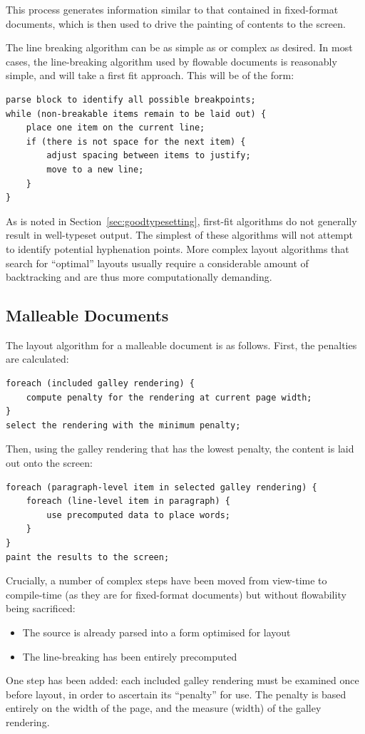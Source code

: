 This process generates information similar to that contained in fixed-format documents, which is then used to drive the painting of contents to the screen.

The line breaking algorithm can be as simple as or complex as desired. In most cases, the line-breaking algorithm used by flowable documents is reasonably simple, and will take a first fit approach. This will be of the form:

{\singlespacing
\begin{lstlisting}
parse block to identify all possible breakpoints;
while (non-breakable items remain to be laid out) {
    place one item on the current line;
    if (there is not space for the next item) {
        adjust spacing between items to justify;
        move to a new line;
    }
}
\end{lstlisting}
}

As is noted in Section~\ref{sec:goodtypesetting}, first-fit algorithms do not generally result in well-typeset output. The simplest of these algorithms will not attempt to identify potential hyphenation points. More complex layout algorithms that search for ``optimal'' layouts usually require a considerable amount of backtracking and are thus more computationally demanding.

\subsection{Malleable Documents}

The layout algorithm for a malleable document is as follows. First, the penalties are calculated:

{\singlespacing
\begin{lstlisting}
foreach (included galley rendering) {
    compute penalty for the rendering at current page width;
}
select the rendering with the minimum penalty;
\end{lstlisting}
}


Then, using the galley rendering that has the lowest penalty, the content is laid out onto the screen:

{\singlespacing
\begin{lstlisting}
foreach (paragraph-level item in selected galley rendering) {
    foreach (line-level item in paragraph) {
        use precomputed data to place words;
    }
}
paint the results to the screen;
\end{lstlisting}
}
Crucially, a number of complex steps have been moved from view-time to compile-time (as they are for fixed-format documents) but without flowability being sacrificed:
\begin{itemize}
 \item The source is already parsed into a form optimised for layout
 \item The line-breaking has been entirely precomputed
\end{itemize}
One step has been added: each included galley rendering must be examined once before layout, in order to ascertain its ``penalty'' for use. The penalty is based entirely on the width of the page, and the \gls{measure} (width) of the galley rendering.%

